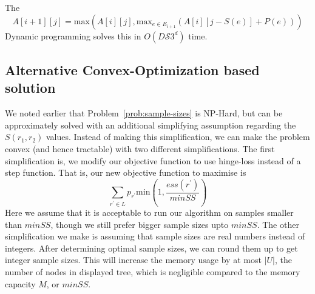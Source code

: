 \documentclass[10pt,journal,compsoc]{IEEEtran}
\newcounter{prob}
\begin{document}
{The%
$$A\left[i+1\right] \left[j \right] = \textrm{max} (A\left[i\right]\left[j\right], \textrm{max}_{e \in E_{i+1}}(A\left[i\right]\left[j-S(e)\right] + P(e)))$$
Dynamic programming solves this in $O(D\mathcal{S}3^d)$ time. 
}

\subsection{Alternative Convex-Optimization based solution}\label{sec:alternative-convex}
We noted earlier that Problem~\ref{prob:sample-sizes} is NP-Hard, but can be approximately solved with an additional simplifying assumption regarding the $S(r_1, r_2)$ values. Instead of making this simplification, we can make the problem convex (and hence tractable) with two different simplifications. The first simplification is, we modify our objective function to use hinge-loss instead of a step function. That is, our new objective function to maximise is $$\sum_{r^{\prime} \in L} p_{r^{\prime}}\textrm{min}\left(1, \frac{ess(r^{\prime})}{minSS}\right)$$
Here we assume that it is acceptable to run our algorithm on samples smaller than $minSS$, though we still prefer bigger sample sizes upto $minSS$. The other simplification we make is assuming that sample sizes are real numbers instead of integers. After determining optimal sample sizes, we can round them up to get integer sample sizes. This will increase the memory usage by at most $|U|$, the number of nodes in displayed tree, which is negligible compared to the memory capacity $M$, or $minSS$.
\end{document}
